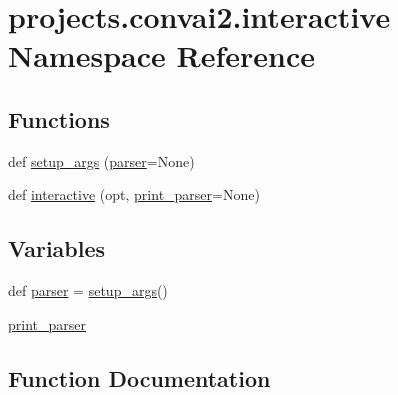 \hypertarget{namespaceprojects_1_1convai2_1_1interactive}{}\section{projects.\+convai2.\+interactive Namespace Reference}
\label{namespaceprojects_1_1convai2_1_1interactive}
\subsection*{Functions}
\begin{DoxyCompactItemize}
\item 
def \hyperlink{namespaceprojects_1_1convai2_1_1interactive_ac1ba8d400d87a3bb10e40d5ab1bcfd86}{setup\+\_\+args} (\hyperlink{namespaceprojects_1_1convai2_1_1interactive_a2780cc10d166dbc5bcdde16cdc633380}{parser}=None)
\item 
def \hyperlink{namespaceprojects_1_1convai2_1_1interactive_a81cb75ad91b081600739897e216e9302}{interactive} (opt, \hyperlink{namespaceprojects_1_1convai2_1_1interactive_a8683646bcf8a96c4e87b52d6a79f4a3a}{print\+\_\+parser}=None)
\end{DoxyCompactItemize}
\subsection*{Variables}
\begin{DoxyCompactItemize}
\item 
def \hyperlink{namespaceprojects_1_1convai2_1_1interactive_a2780cc10d166dbc5bcdde16cdc633380}{parser} = \hyperlink{namespaceprojects_1_1convai2_1_1interactive_ac1ba8d400d87a3bb10e40d5ab1bcfd86}{setup\+\_\+args}()
\item 
\hyperlink{namespaceprojects_1_1convai2_1_1interactive_a8683646bcf8a96c4e87b52d6a79f4a3a}{print\+\_\+parser}
\end{DoxyCompactItemize}


\subsection{Function Documentation}
\mbox{\label{namespaceprojects_1_1convai2_1_1interactive_a81cb75ad91b081600739897e216e9302}} 
